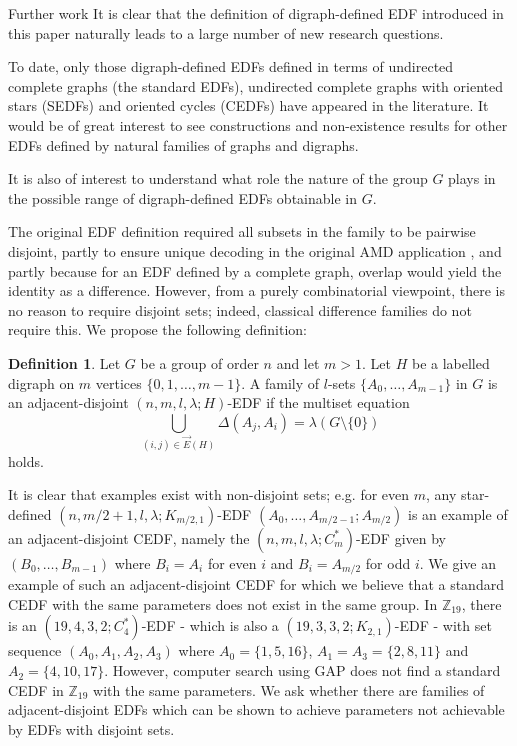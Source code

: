 \documentclass[12pt, a4paper]{article}
\theoremstyle{definition}
\newtheorem{definition}[theorem]{Definition}
\newcommand{\E}{\overrightarrow{E}}
\begin{document}
\begin{section}{Further work}
It is clear that the definition of digraph-defined EDF introduced in this paper naturally leads to a large number of new research questions.  

To date, only those digraph-defined EDFs defined in terms of undirected complete graphs (the standard EDFs), undirected complete graphs with oriented stars (SEDFs) and oriented cycles (CEDFs) have appeared in the literature.  It would be of great interest to see constructions and non-existence results for other EDFs defined by natural families of graphs and digraphs.

It is also of interest to understand what role the nature of the group $G$ plays in the possible range of digraph-defined EDFs obtainable in $G$.

The original EDF definition required all subsets in the family to be pairwise disjoint, partly to ensure unique decoding in the original AMD application \cite{PatSti1}, and partly because for an EDF defined by a complete graph, overlap would yield the identity as a difference.  However, from a purely combinatorial viewpoint, there is no reason to require disjoint sets; indeed, classical difference families do not require this.  We propose the following definition:

\begin{definition}
Let $G$ be a group of order $n$ and let $m>1$.  Let $H$ be a labelled digraph on $m$ vertices $\{0,1,\ldots,m-1\}$.  A family of $l$-sets $\{A_0, \ldots, A_{m-1}\}$ in $G$ is an adjacent-disjoint $(n,m,l,\lambda; H)$-EDF if the multiset equation
$$ \bigcup_{(i,j) \in \E(H)} \Delta(A_j,A_i) = \lambda (G \setminus \{0\})$$ 
holds.
\end{definition}

It is clear that examples exist with non-disjoint sets; e.g. for even $m$, any star-defined $(n,m/2+1,l,\lambda; K_{m/2,1})$-EDF $(A_0,\ldots,A_{m/2-1}; A_{m/2})$ is an example of an adjacent-disjoint CEDF, namely the $(n,m,l,\lambda; C_m^*)$-EDF given by $(B_0,\ldots, B_{m-1})$ where $B_i=A_i$ for even $i$ and $B_i=A_{m/2}$ for odd $i$.  We give an example of such an adjacent-disjoint CEDF for which we believe that a standard CEDF with the same parameters does not exist in the same group.  In $\mathbb{Z}_{19}$, there is an $(19,4,3,2; C_4^*)$-EDF - which is also a $(19,3,3,2;K_{2,1})$-EDF - with set sequence $(A_0,A_1,A_2,A_3)$ where $A_0=\{1,5,16\}$, $A_1=A_3=\{2,8,11\}$ and $A_2=\{4,10,17\}$.  However, computer search using GAP does not find a standard CEDF in $\mathbb{Z}_{19}$ with the same parameters.  We ask whether there are families of adjacent-disjoint EDFs which can be shown to achieve parameters not achievable by EDFs with disjoint sets.


\end{section}
\end{document}

